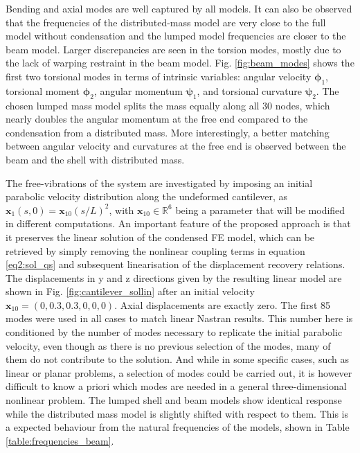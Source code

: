 \documentclass[11pt]{article}
\begin{document}
%
Bending and axial modes are well captured by all models. It can also be observed that the frequencies of the distributed-mass model are very close to the full model without condensation and the lumped model frequencies are closer to the beam model. Larger discrepancies are seen in the torsion modes, mostly due to the lack of warping restraint in the beam model. Fig. \ref{fig:beam_modes} shows the first two torsional modes in terms of intrinsic variables: angular velocity $\pmb{\phi}_1$, torsional moment $\pmb{\phi}_2$, angular momentum $\pmb{\psi}_1$, and torsional curvature $\pmb{\psi}_2$. The chosen lumped mass model splits the mass equally along all 30 nodes, which  nearly doubles the angular momentum at the free end compared to the condensation from a distributed mass. More interestingly, a better matching between angular velocity and curvatures at the free end is observed between the beam and the shell with distributed mass.

The free-vibrations of the system are investigated by imposing an initial parabolic velocity distribution along the undeformed cantilever, as $\pmb{x}_1(s,0) = \pmb{x}_{10}(s/L)^2 $, with $\pmb{x}_{10} \in \mathbb{R}^6$ being a parameter that will be modified in different computations. An important feature of the proposed approach is that it preserves the linear solution of the condensed FE model, which can be retrieved by simply removing the nonlinear coupling terms in equation \ref{eq2:sol_qs} and subsequent linearisation of the displacement recovery relations. The displacements in y and z directions given by the resulting linear model are shown in Fig. \ref{fig:cantilever_sollin} after an initial velocity $\pmb{x}_{10} = (0,0.3,0.3,0,0,0)$. Axial displacements are exactly zero. The first 85 modes were used in all cases to match linear Nastran results. This number here is conditioned by the number of modes necessary to replicate the initial parabolic velocity, even though as there is no previous selection of the modes, many of them do not contribute to the solution. And while in some specific cases, such as linear or planar problems, a selection of modes could be carried out, it is however difficult to know a priori which modes are needed in a general three-dimensional nonlinear problem. The lumped shell and beam models show identical response while the distributed mass model is slightly shifted with respect to them. This is a expected behaviour from the natural frequencies of the models, shown in Table \ref{table:frequencies_beam}.
\end{document}
